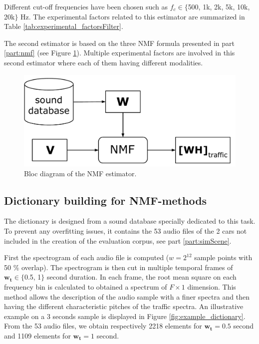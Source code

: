 \documentclass[review,5p,twocolumn,sort&compress,times]{elsarticle}
\begin{document}
Different cut-off frequencies have been chosen such as $f_c \in \lbrace$500, 1k, 2k, 5k, 10k, 20k$\rbrace$ Hz. The experimental factors related to this estimator are summarized in Table \ref{tab:experimental_factorsFilter}.

The second estimator is based on the three NMF formula presented in part \ref{part:nmf} (see Figure \ref{fig:bloc_diagram_nmf}). Multiple experimental factors are involved in this second estimator where each of them having different modalities.

\begin{figure}[t]
\centering
\includegraphics[width=.9\linewidth]{figures/bloc_diagram_NMF_EN_2.pdf}
\caption{Bloc diagram of the NMF estimator.}
\label{fig:bloc_diagram_nmf}
\end{figure}

\subsection{Dictionary building for NMF-methods}\label{part:dictionary_building}

The dictionary is designed from a sound database specially dedicated to this task. To prevent any overfitting issues, it contains the 53 audio files of the 2 cars not included  in the creation of the evaluation corpus, see part \ref{part:simScene}.

First the spectrogram of each audio file is computed ($w = 2^{12}$ sample points with 50 $\%$ overlap). The spectrogram is then cut in multiple temporal frames of $\mathbf{w_t}  \in \lbrace$0.5, 1$\rbrace$ second duration. In each frame, the root mean square on each frequency bin is calculated to obtained a spectrum of $F \times 1$ dimension. This method allows the description of the audio sample with a finer spectra and then having the different characteristic pitches of the traffic spectra. An illustrative example on a 3 seconds sample is displayed in Figure \ref{fig:example_dictionary}. From the 53 audio files, we obtain respectively 2218 elements for $\mathbf{w_t} = 0.5$ second and 1109 elements for $\mathbf{w_t} = 1$ second.
\end{document}
